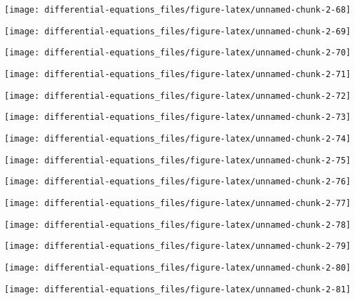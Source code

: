 \documentclass[]{tufte-handout}
\begin{document}
\begin{marginfigure}
\texttt{[image: differential-equations\_files/figure-latex/unnamed-chunk-2-68]} \end{marginfigure}
\begin{marginfigure}
\texttt{[image: differential-equations\_files/figure-latex/unnamed-chunk-2-69]} \end{marginfigure}
\begin{marginfigure}
\texttt{[image: differential-equations\_files/figure-latex/unnamed-chunk-2-70]} \end{marginfigure}
\begin{marginfigure}
\texttt{[image: differential-equations\_files/figure-latex/unnamed-chunk-2-71]} \end{marginfigure}
\begin{marginfigure}
\texttt{[image: differential-equations\_files/figure-latex/unnamed-chunk-2-72]} \end{marginfigure}
\begin{marginfigure}
\texttt{[image: differential-equations\_files/figure-latex/unnamed-chunk-2-73]} \end{marginfigure}
\begin{marginfigure}
\texttt{[image: differential-equations\_files/figure-latex/unnamed-chunk-2-74]} \end{marginfigure}
\begin{marginfigure}
\texttt{[image: differential-equations\_files/figure-latex/unnamed-chunk-2-75]} \end{marginfigure}
\begin{marginfigure}
\texttt{[image: differential-equations\_files/figure-latex/unnamed-chunk-2-76]} \end{marginfigure}
\begin{marginfigure}
\texttt{[image: differential-equations\_files/figure-latex/unnamed-chunk-2-77]} \end{marginfigure}
\begin{marginfigure}
\texttt{[image: differential-equations\_files/figure-latex/unnamed-chunk-2-78]} \end{marginfigure}
\begin{marginfigure}
\texttt{[image: differential-equations\_files/figure-latex/unnamed-chunk-2-79]} \end{marginfigure}
\begin{marginfigure}
\texttt{[image: differential-equations\_files/figure-latex/unnamed-chunk-2-80]} \end{marginfigure}
\begin{marginfigure}
\texttt{[image: differential-equations\_files/figure-latex/unnamed-chunk-2-81]} \end{marginfigure}
\end{document}
